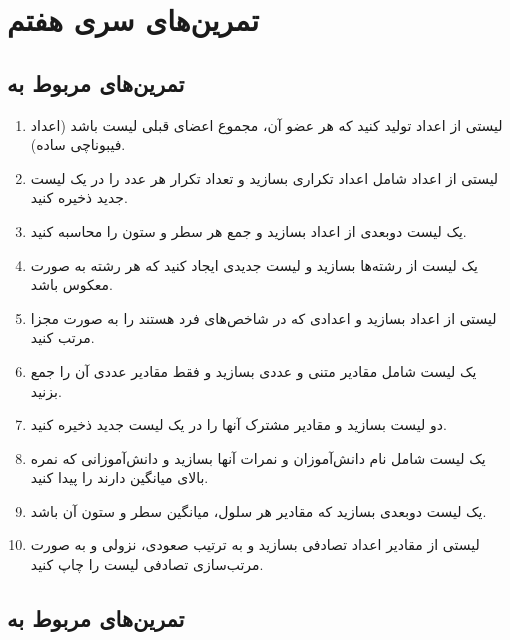 \documentclass[b5paper,12pt]{article}
\begin{document}
	
	
	\newpage
	\section*{تمرین‌های سری هفتم}
	
	\subsection*{تمرین‌های مربوط به }
	
	\begin{enumerate}
		\item لیستی از اعداد تولید کنید که هر عضو آن، مجموع اعضای قبلی لیست باشد (اعداد فیبوناچی ساده).
		\item لیستی از اعداد شامل اعداد تکراری بسازید و تعداد تکرار هر عدد را در یک لیست جدید ذخیره کنید.
		\item یک لیست دو‌بعدی از اعداد بسازید و جمع هر سطر و ستون را محاسبه کنید.
		\item یک لیست از رشته‌ها بسازید و لیست جدیدی ایجاد کنید که هر رشته به صورت معکوس باشد.
		\item لیستی از اعداد بسازید و اعدادی که در شاخص‌های فرد هستند را به صورت مجزا مرتب کنید.
		\item یک لیست شامل مقادیر متنی و عددی بسازید و فقط مقادیر عددی آن را جمع بزنید.
		\item دو لیست بسازید و مقادیر مشترک آنها را در یک لیست جدید ذخیره کنید.
		\item یک لیست شامل نام دانش‌آموزان و نمرات آنها بسازید و دانش‌آموزانی که نمره بالای میانگین دارند را پیدا کنید.
		\item یک لیست دو‌بعدی بسازید که مقادیر هر سلول، میانگین سطر و ستون آن باشد.
		\item لیستی از مقادیر اعداد تصادفی بسازید و به ترتیب صعودی، نزولی و به صورت مرتب‌سازی تصادفی لیست را چاپ کنید.
	\end{enumerate}
	
	\subsection*{تمرین‌های مربوط به }
	
\end{document}
